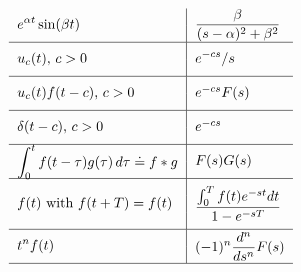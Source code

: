 \documentclass[12pt]{book}
\begin{document}
$$\begin{tabular}{ l |  l }
  \multirow{2}{*}{$\displaystyle e^{\a t}\sin(\b t)$}
  & \multirow{2}{*}{$\displaystyle \frac{\b}{(s-\a)^2 + \b^2}$} \\ \\ \hline
  \multirow{2}{*}{$\displaystyle u_c(t)$, $c > 0$}
  & \multirow{2}{*}{$\displaystyle {e^{-cs}}/{s}$} \\ \\ \hline
  \multirow{2}{*}{$u_c(t)f(t-c)$, $c > 0$}
  & \multirow{2}{*}{$e^{-cs}F(s)$} \\  \\ \hline
  \multirow{2}{*}{$\delta(t-c)$, $c > 0$} 
  & \multirow{2}{*}{$e^{-cs}$} \\  \\ \hline
  \multirow{2}{*}{$\displaystyle \int_0^t f(t-\t)g(\t) \,d\t \doteq f*g$} 
  & \multirow{2}{*}{$\displaystyle F(s)G(s)$} \\ \\ \hline
  \multirow{3}{*}{$\displaystyle f(t)$ with $\displaystyle f(t+T)=f(t)$}
  & \multirow{3}{*}{$\displaystyle \frac{\int_0^Tf(t) e^{-st}dt}{1-e^{-sT}}$}
  \\ \\ \\ \hline
  \multirow{2}{*}{$\displaystyle t^n f(t)$}
  & \multirow{2}{*}{$\displaystyle (-1)^n \frac{d^n}{ds^n} F(s)$} \\ \\ \hline
\end{tabular}\\
$$
\end{document}
